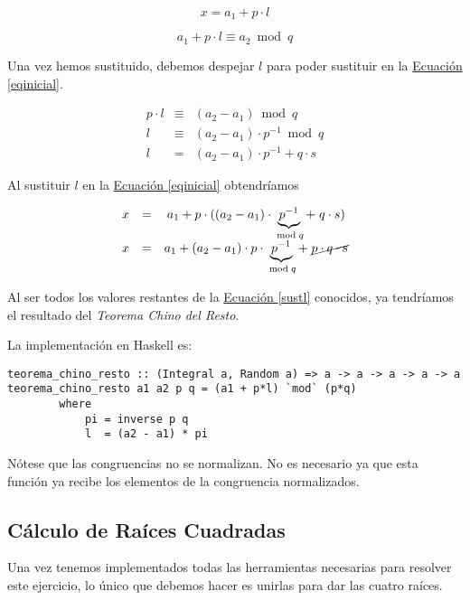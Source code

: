 \documentclass[10pt,spanish]{article}
\begin{document}
\begin{equation}
\label{eqdespx}
    x = a_1 + p \cdot l
\end{equation}

\begin{equation}
\label{eqsusx}
    a_1 + p \cdot l \equiv a_2 \bmod q
\end{equation}


Una vez hemos sustituido, debemos despejar $l$ para poder sustituir en la \hyperref[eqinicial]{Ecuación \ref*{eqinicial}}.

\begin{equation}
\label{eqpdesl}
\begin{matrix}
p \cdot l & \equiv & (a_2 - a_1) \bmod q \\
l & \equiv & (a_2 - a_1) \cdot p^{-1} \bmod q\\
l & = & (a_2 - a_1) \cdot p^{-1} + q \cdot s
\end{matrix}     
\end{equation}

Al sustituir $l$ en la \hyperref[eqinicial]{Ecuación \ref*{eqinicial}} obtendríamos

\begin{equation}
\label{sustl}
\begin{matrix}
x & = & a_1 + p \cdot ((a_2 - a_1) \cdot \underbrace{p^{-1}}_{\bmod q} +\; q \cdot s)\\
x & = & a_1 + (a_2 - a_1) \cdot p \cdot \underbrace{p^{-1}}_{\bmod q} +\; \cancel{p \cdot q \cdot s}
\end{matrix}
\end{equation}

Al ser todos los valores restantes de la \hyperref[sustl]{Ecuación \ref*{sustl}} conocidos, ya tendríamos el resultado del \textcolor{rojo}{\textit{Teorema Chino del Resto}}.

La implementación en Haskell es:

\begin{verbatim}
teorema_chino_resto :: (Integral a, Random a) => a -> a -> a -> a -> a
teorema_chino_resto a1 a2 p q = (a1 + p*l) `mod` (p*q)
        where
            pi = inverse p q
            l  = (a2 - a1) * pi
\end{verbatim}

Nótese que las congruencias no se normalizan. No es necesario ya que esta función ya recibe los elementos de la congruencia normalizados.

\subsection{\textcolor{rojo}Cálculo de Raíces Cuadradas}
Una vez tenemos implementados todas las herramientas necesarias para resolver este ejercicio, lo único que debemos hacer es unirlas para dar las cuatro raíces.
\end{document}
